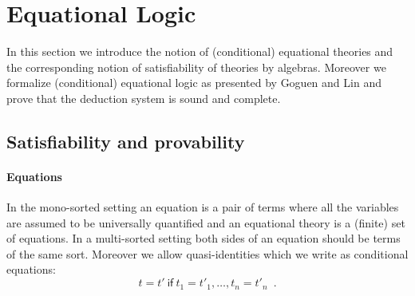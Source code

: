 \section{Equational Logic}
\label{sec:eqlog}

In this section we introduce the notion of (conditional) equational
theories and the corresponding notion of satisfiability of theories
by algebras. Moreover we formalize (conditional) equational logic as
presented by Goguen and Lin \cite{goguen2005specifying} and prove that
the deduction system is sound and complete.

\subsection{Satisfiability and provability}

\paragraph*{Equations} In the mono-sorted setting an equation is a pair
of terms where all the variables are assumed to be universally
quantified and an equational theory is a (finite) set of equations.
In a  multi-sorted setting both sides of an equation should be terms
of the same sort. Moreover we allow quasi-identities which we
write as conditional equations:
\[ t = t'\ \mathsf{if} \  t_1 = t'_1, \ldots, t_n = t'_n \enspace . \]

